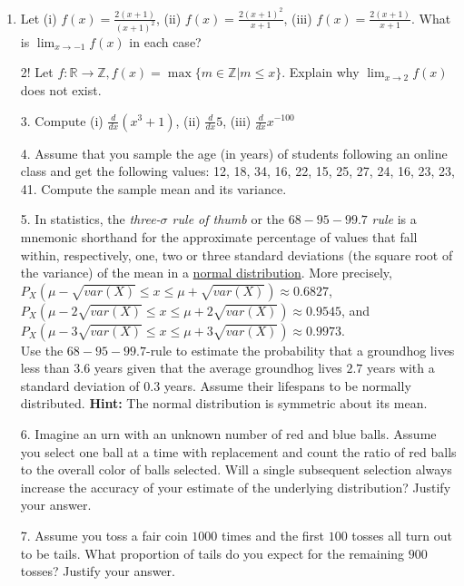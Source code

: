 \documentclass{article}
\begin{document}
\begin{enumerate}
	\item Let (i) $f(x) = \frac{2(x + 1)}{(x + 1)^2}$, (ii) $f(x) = \frac{2(x + 1)^2}{x + 1}$, (iii) $f(x) = \frac{2(x + 1)}{x + 1}$. What is $\lim_{x \to -1} f(x)$ in each case?
	\item[2!] Let $f: \mathbb{R} \to \mathbb{Z}, f(x) = \max\{m \in \mathbb{Z} | m \leq x\}$. Explain why $\lim_{x \to 2} f(x)$ does not exist. 
	\item[3.] Compute (i) $\frac{d}{dx}(x^3 + 1)$, (ii) $\frac{d}{dx}5$, (iii) $\frac{d}{dx} x^{-100}$
	\item[4.] Assume that you sample the age (in years) of students following an online class and get the following values: 12, 18, 34, 16, 22, 15, 25, 27, 24, 16, 23, 23, 41. Compute the sample mean and its variance.
	\item[5.] In statistics, the {\em three-$\sigma$ rule of thumb} or the $68-95-99.7$ {\em rule} is a mnemonic shorthand for the approximate percentage of values that fall within, respectively, one, two or three standard deviations (the square root of the variance) of the mean in a \href{https://en.wikipedia.org/wiki/Normal_distribution}{normal distribution}. More precisely, $P_X(\mu - \sqrt{var(X)} \leq x \leq \mu + \sqrt{var(X)}) \approx 0.6827$,  $P_X(\mu - 2\sqrt{var(X)} \leq x \leq \mu + 2\sqrt{var(X)}) \approx 0.9545$, and $P_X(\mu - 3\sqrt{var(X)} \leq x \leq \mu + 3\sqrt{var(X)}) \approx 0.9973$.\\ Use the $68-95-99.7$-rule to estimate the probability that a groundhog lives less than $3.6$ years given that the average groundhog lives $2.7$ years with a standard deviation of $0.3$ years. Assume their lifespans to be normally distributed. {\bf Hint:} The normal distribution is symmetric about its mean.
	\item[6.] Imagine an urn with an unknown number of red and blue balls. Assume you select one ball at a time with replacement and count the ratio of red balls to the overall color of balls selected. Will a single subsequent selection always increase the accuracy of your estimate of the underlying distribution? Justify your answer.  
	\item[7.] Assume you toss a fair coin $1000$ times and the first $100$ tosses all turn out to be tails. What proportion of tails do you expect for the remaining $900$ tosses? Justify your answer.
\end{enumerate}		
\end{document}
